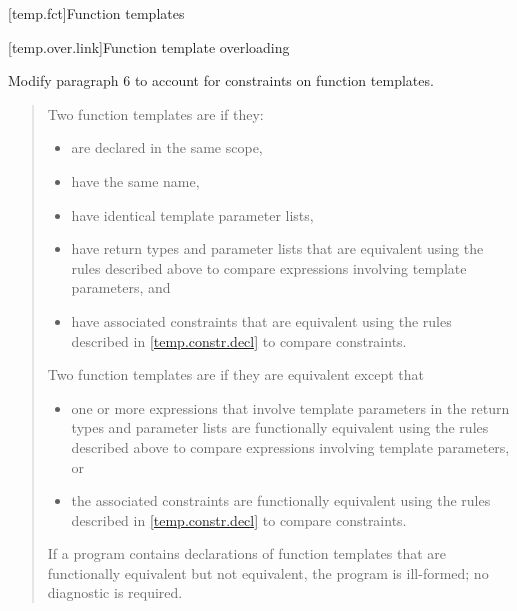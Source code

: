 [temp.fct]{Function templates}

[temp.over.link]{Function template overloading}

Modify paragraph 6 to account for constraints on function templates.

\begin{quote}
\setcounter{Paras}{5}
\pnum

% 
\begin{addedblock}
Two function templates are  if they:
\begin{itemize}
\item are declared in the same scope,

\item have the same name,

\item have identical template parameter lists,

\item have return types and parameter lists that are equivalent using the 
rules described above to compare expressions involving template parameters, and

\item have associated constraints that are equivalent using the rules 
described in \ref{temp.constr.decl} to compare constraints.
\end{itemize}
\end{addedblock}
% 
Two function templates are  if they 
are equivalent except that 
\begin{addedblock}
\begin{itemize}
\item one or more expressions that involve template parameters in the return 
      types and parameter lists are functionally equivalent using the rules 
      described above to compare expressions involving template parameters, or
\item the associated constraints are functionally equivalent using the rules 
      described in \ref{temp.constr.decl} to compare constraints.
\end{itemize}
\end{addedblock}
% 
If a program contains declarations of function templates that are 
functionally equivalent but not equivalent, the program is ill-formed; 
no diagnostic is required.
\end{quote}


